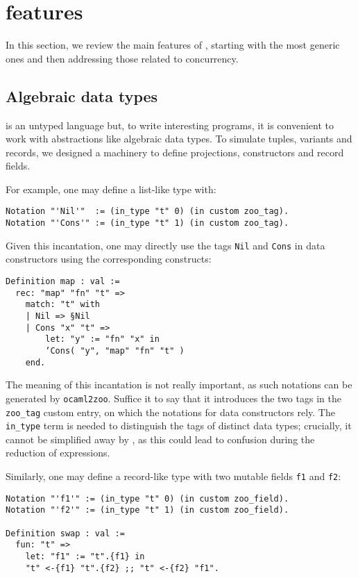 \section{\Zoo features}
\label{sec:features}

In this section, we review the main features of \Zoo, starting with the most generic ones and then addressing those related to concurrency.

\subsection{Algebraic data types}

\Zoo is an untyped language but, to write interesting programs, it is convenient to work with abstractions like algebraic data types.
To simulate tuples, variants and records, we designed a machinery to define projections, constructors and record fields.

For example, one may define a list-like type with:

\begin{verbatim}
Notation "'Nil'"  := (in_type "t" 0) (in custom zoo_tag).
Notation "'Cons'" := (in_type "t" 1) (in custom zoo_tag).
\end{verbatim}

Given this incantation, one may directly use the tags \texttt{Nil} and \texttt{Cons} in data constructors using the corresponding \ZooLang constructs:

\begin{verbatim}
Definition map : val :=
  rec: "map" "fn" "t" =>
    match: "t" with
    | Nil => §Nil
    | Cons "x" "t" =>
        let: "y" := "fn" "x" in
        ‘Cons( "y", "map" "fn" "t" )
    end.
\end{verbatim}

The meaning of this incantation is not really important, as such notations can be generated by \texttt{ocaml2zoo}.
Suffice it to say that it introduces the two tags in the \texttt{zoo\_tag} custom entry, on which the notations for data constructors rely.
The \texttt{in_type} term is needed to distinguish the tags of distinct data types; crucially, it cannot be simplified away by \Coq, as this could lead to confusion during the reduction of expressions.

Similarly, one may define a record-like type with two mutable fields \texttt{f1} and \texttt{f2}:

\begin{verbatim}
Notation "'f1'" := (in_type "t" 0) (in custom zoo_field).
Notation "'f2'" := (in_type "t" 1) (in custom zoo_field).

Definition swap : val :=
  fun: "t" =>
    let: "f1" := "t".{f1} in
    "t" <-{f1} "t".{f2} ;; "t" <-{f2} "f1".
\end{verbatim}

